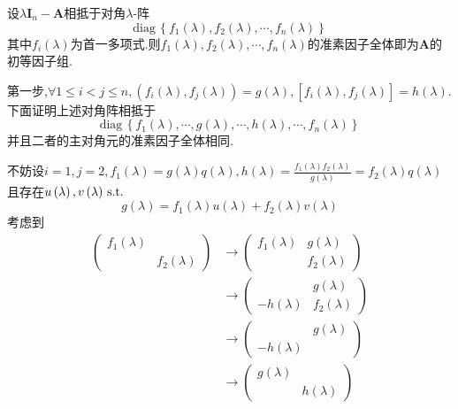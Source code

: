 \begin{green}
\begin{lemma}[初等因子求得]\label{lemma:初等因子求得}
    设$\lambda\bm{I}_n-\bm{A}$相抵于对角$\lambda$-阵\[
    \mathrm{diag}\,\left\{
        f_1\left(\lambda\right),f_2\left(\lambda\right),\cdots,f_n\left(\lambda\right)
    \right\}
    \]其中$f_i\left(\lambda\right)$为首一多项式.则$f_1\left(\lambda\right),f_2\left(\lambda\right),\cdots,f_n\left(\lambda\right)$的准素因子全体即为$\bm{A}$的初等因子组.
\end{lemma}
\begin{Proof}
第一步,$\forall 1\leqslant i<j\leqslant n,\left(
    f_i\left(\lambda\right),f_j\left(\lambda\right)
\right)=g\left(\lambda\right),\left[
    f_i\left(\lambda\right),f_j\left(\lambda\right)
\right]=h\left(\lambda\right).$下面证明上述对角阵相抵于\[
\mathrm{diag}\,\left\{
    f_1\left(\lambda\right),\cdots,g\left(\lambda\right),\cdots,h\left(\lambda\right),\cdots,f_n\left(\lambda\right)
\right\}
\]并且二者的主对角元的准素因子全体相同.

不妨设$\displaystyle i=1,j=2,f_1\left(\lambda\right)=g\left(\lambda\right)q\left(\lambda\right),h\left(\lambda\right)=\frac{
    f_1\left(\lambda\right)f_2\left(\lambda\right)
}{g\left(\lambda\right)}=f_2\left(\lambda\right)q\left(\lambda\right)$且存在$u\left(\lambda\right),v\left(\lambda\right)\,\textup{s.t.}$\[
g\left(\lambda\right)=f_1\left(\lambda\right)u\left(\lambda\right)+f_2\left(\lambda\right)v\left(\lambda\right)
\]考虑到\begin{align*}
    \begin{pmatrix}
        f_1\left(\lambda\right)&\\
        &f_2\left(\lambda\right)
    \end{pmatrix}&\longrightarrow
    \begin{pmatrix}
        f_1\left(\lambda\right)&g\left(\lambda\right)\\
        &f_2\left(\lambda\right)
    \end{pmatrix}\\
    &\longrightarrow
    \begin{pmatrix}
        &g\left(\lambda\right)\\
        -h\left(\lambda\right)&f_2\left(\lambda\right)
    \end{pmatrix}\\
    &\longrightarrow\begin{pmatrix}
        &g\left(\lambda\right)\\
        -h\left(\lambda\right)&
    \end{pmatrix}\\
    &\longrightarrow\begin{pmatrix}
        g\left(\lambda\right)&\\
        &h\left(\lambda\right)
    \end{pmatrix}
\end{align*}


\end{Proof}
\end{green}
